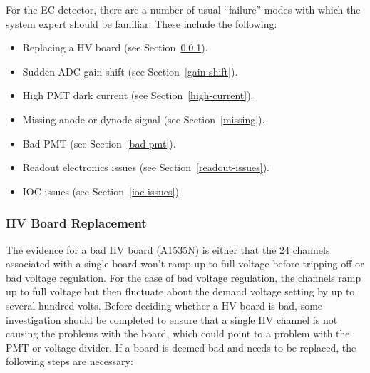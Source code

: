 \documentclass[letterpaper,10pt]{article}
\begin{document}
For the EC detector, there are a number of usual ``failure'' modes with which the system expert should
be familiar. These include the following:

\begin{itemize}
\item Replacing a HV board (see Section~\ref{board-swap}).
\item Sudden ADC gain shift (see Section~\ref{gain-shift}).
\item High PMT dark current (see Section~\ref{high-current}).
\item Missing anode or dynode signal (see Section~\ref{missing}).
\item Bad PMT (see Section~\ref{bad-pmt}).
\item Readout electronics issues (see Section~\ref{readout-issues}).
\item IOC issues (see Section~\ref{ioc-issues}).
\end{itemize}

\subsubsection{HV Board Replacement}
\label{board-swap}

The evidence for a bad HV board (A1535N) is either that the 24 channels associated with a single 
board won't ramp up to full voltage before tripping off or bad voltage regulation. For the case
of bad voltage regulation, the channels ramp up to full voltage but then fluctuate about the demand 
voltage setting by up to several hundred volts. Before deciding whether a HV board is bad, some
investigation should be completed to ensure that a single HV channel is not causing the problems
with the board, which could point to a problem with the PMT or voltage divider. If a board is deemed 
bad and needs to be replaced, the following steps are necessary:
\end{document}
